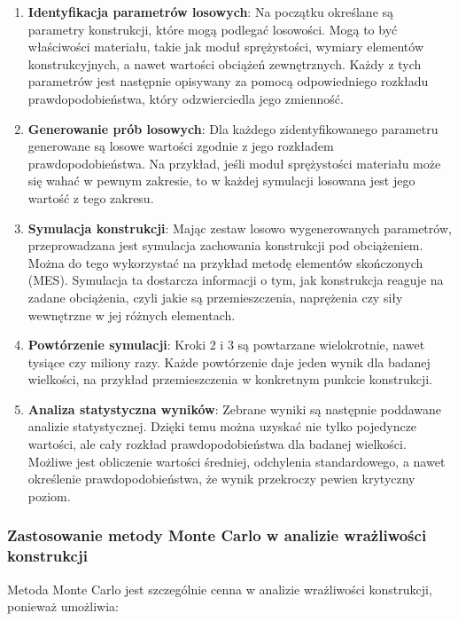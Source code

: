 \begin{enumerate}
    \item \textbf{Identyfikacja parametrów losowych}: Na początku określane są parametry konstrukcji, które mogą podlegać losowości. Mogą to być właściwości materiału, takie jak moduł sprężystości, wymiary elementów konstrukcyjnych, a nawet wartości obciążeń zewnętrznych. Każdy z tych parametrów jest następnie opisywany za pomocą odpowiedniego rozkładu prawdopodobieństwa, który odzwierciedla jego zmienność.
    \item \textbf{Generowanie prób losowych}: Dla każdego zidentyfikowanego parametru generowane są losowe wartości zgodnie z jego rozkładem prawdopodobieństwa. Na przykład, jeśli moduł sprężystości materiału może się wahać w pewnym zakresie, to w każdej symulacji losowana jest jego wartość z tego zakresu.
    \item \textbf{Symulacja konstrukcji}: Mając zestaw losowo wygenerowanych parametrów, przeprowadzana jest symulacja zachowania konstrukcji pod obciążeniem. Można do tego wykorzystać na przykład metodę elementów skończonych (MES). Symulacja ta dostarcza informacji o tym, jak konstrukcja reaguje na zadane obciążenia, czyli jakie są przemieszczenia, naprężenia czy siły wewnętrzne w jej różnych elementach.
    \item \textbf{Powtórzenie symulacji}: Kroki 2 i 3 są powtarzane wielokrotnie, nawet tysiące czy miliony razy. Każde powtórzenie daje jeden wynik dla badanej wielkości, na przykład przemieszczenia w konkretnym punkcie konstrukcji.
    \item \textbf{Analiza statystyczna wyników}: Zebrane wyniki są następnie poddawane analizie statystycznej. Dzięki temu można uzyskać nie tylko pojedyncze wartości, ale cały rozkład prawdopodobieństwa dla badanej wielkości. Możliwe jest obliczenie wartości średniej, odchylenia standardowego, a nawet określenie prawdopodobieństwa, że wynik przekroczy pewien krytyczny poziom.
\end{enumerate}

\newpage
\subsubsection*{Zastosowanie metody Monte Carlo w analizie wrażliwości konstrukcji}
Metoda Monte Carlo jest szczególnie cenna w analizie wrażliwości konstrukcji, ponieważ umożliwia:

